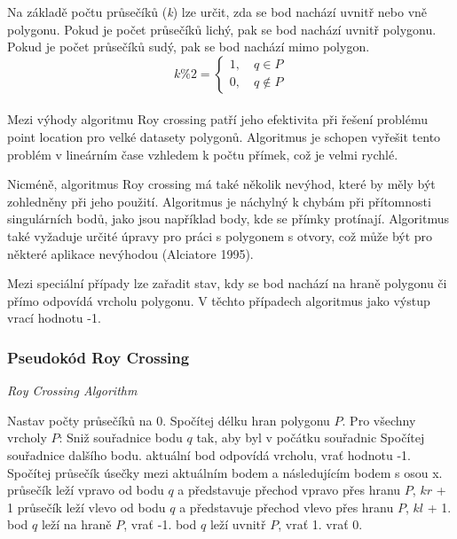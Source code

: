 \documentclass[a4paper,12pt]{article}
\begin{document}
    Na základě počtu průsečíků (\emph{k}) lze určit, zda se bod nachází uvnitř nebo vně polygonu. Pokud je počet průsečíků lichý, pak se bod nachází uvnitř polygonu. Pokud je počet průsečíků sudý, pak se bod nachází mimo polygon.\\

    \begin{equation*}
    k\%2=
    \begin{cases}
    1, \quad q \in P\\
    0, \quad q \notin P
    \end{cases}
    \end{equation*}\\

    Mezi výhody algoritmu Roy crossing patří jeho efektivita při řešení problému point location pro velké datasety polygonů. Algoritmus je schopen vyřešit tento problém v lineárním čase vzhledem k počtu přímek, což je velmi rychlé. 

    Nicméně, algoritmus Roy crossing má také několik nevýhod, které by měly být zohledněny při jeho použití. Algoritmus je náchylný k chybám při přítomnosti singulárních bodů, jako jsou například body, kde se přímky protínají. Algoritmus také vyžaduje určité úpravy pro práci s polygonem s otvory, což může být pro některé aplikace nevýhodou (Alciatore 1995).

    Mezi speciální případy lze zařadit stav, kdy se bod nachází na hraně polygonu či přímo odpovídá vrcholu polygonu. V těchto případech algoritmus jako výstup vrací hodnotu -1.
    \subsubsection{Pseudokód Roy Crossing}
    \begin{algorithm}
    \caption {\textit{Roy Crossing Algorithm}}
    \begin{algorithmic}[1]
        \State  Nastav počty průsečíků na 0.
        \State Spočítej délku hran polygonu $P$.
        \State Pro všechny vrcholy $P$:
        \State \indent Sniž souřadnice bodu $q$ tak, aby byl v počátku souřadnic
        \State \indent Spočítej souřadnice dalšího bodu.
        \State {} aktuální bod odpovídá vrcholu, vrať hodnotu -1.
        \State \indent Spočítej průsečík úsečky mezi aktuálním bodem a následujícím bodem s osou x.
        \State {} průsečík leží vpravo od bodu $q$ a představuje přechod vpravo přes hranu $P$, $kr$ + 1
        \State {} průsečík leží vlevo od bodu $q$ a představuje přechod vlevo přes hranu $P$, $kl$ + 1.
         bod $q$ leží na hraně $P$, vrať -1.
         bod $q$ leží uvnitř $P$, vrať 1.
         vrať 0.
    \end{algorithmic}
    \end{algorithm}
\end{document}
